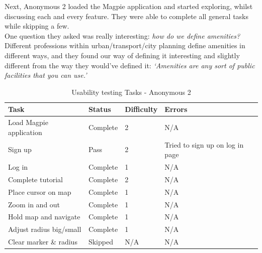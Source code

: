 \noindent Next, Anonymous 2 loaded the Magpie application and started exploring, whilst discussing each and every feature. They were able to complete all general tasks while skipping a few.\\
One question they asked was really interesting: \emph{how do we define amenities?}\\ Different professions within urban/transport/city planning define amenities in different ways, and they found our way of defining it interesting and slightly different from the way they would've defined it: \emph{`Amenities are any sort of public facilities that you can use.'}\\
\begin{table}[h!]
    \centering
    \caption{Usability testing Tasks - Anonymous 2}
    \begin{tabular}{|p{}|p{}|p{}|p{}|}
        \hline
        \textbf{Task}                 & \textbf{Status} & \textbf{Difficulty} & \textbf{Errors}                 \\
        \hline
        Load Magpie application       & Complete        & 2                   & N/A                             \\
        \hline
        Sign up                       & Pass            & 2                   & Tried to sign up on log in page \\
        \hline
        Log in                        & Complete        & 1                   & N/A                             \\
        \hline
        Complete tutorial             & Complete        & 2                   & N/A                             \\
        \hline
        Place cursor on map           & Complete        & 1                   & N/A                             \\
        \hline
        Zoom in and out               & Complete        & 1                   & N/A                             \\
        \hline
        Hold map and navigate         & Complete        & 1                   & N/A                             \\
        \hline
        Adjust radius big/small       & Complete        & 1                   & N/A                             \\
        \hline
        Clear marker \& radius        & Skipped         & N/A                 & N/A                             \\

\end{tabular}
\end{table}
